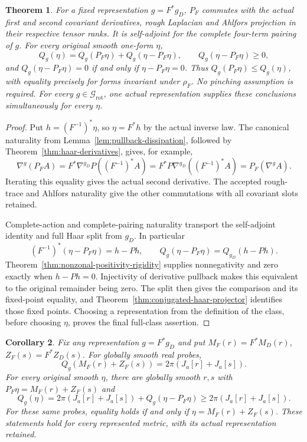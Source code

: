 \documentclass[11pt]{article}
\newtheorem{theorem}{Theorem}[section]
\newtheorem{corollary}[theorem]{Corollary}
\begin{document}
\begin{theorem}\label{thm:represented-haar-rigidity}
For a fixed representation $g=F^*g_D$, $P_F$ commutes with the actual
first and second covariant derivatives, rough Laplacian and Ahlfors projection
in their respective tensor ranks. It is self-adjoint for the complete
four-term pairing of $g$. For every original smooth one-form $\eta$,
\begin{equation}\label{eq:represented-haar-split}
 Q_g(\eta)=Q_g(P_F\eta)+Q_g(\eta-P_F\eta),\qquad
 Q_g(\eta-P_F\eta)\geq0,
\end{equation}
and $Q_g(\eta-P_F\eta)=0$ if and only if $\eta-P_F\eta=0$.
Thus $Q_g(P_F\eta)\leq Q_g(\eta)$, with equality precisely for forms
invariant under $\rho_F$. No pinching assumption is required.
For every $g\in\mathcal G_{\mathrm{rot}}$, one actual representation supplies
these conclusions simultaneously for every $\eta$.
\end{theorem}

\begin{proof}
Put $h=(F^{-1})^*\eta$, so $\eta=F^*h$ by the actual inverse law.
The canonical naturality from Lemma~\ref{lem:pullback-dissipation},
followed by Theorem~\ref{thm:haar-derivatives}, gives, for example,
\[
 \nabla^g(P_F A)
 =F^*\nabla^{g_D}P((F^{-1})^*A)
 =F^*P\nabla^{g_D}((F^{-1})^*A)
 =P_F(\nabla^g A).
\]
Iterating this equality gives the actual second derivative. The accepted
rough-trace and Ahlfors naturality give the other commutations with all
covariant slots retained.

Complete-action and complete-pairing naturality transport the self-adjoint
identity and full Haar split from $g_D$. In particular
\[
 (F^{-1})^*(\eta-P_F\eta)=h-Ph,\qquad
 Q_g(\eta-P_F\eta)=Q_{g_D}(h-Ph).
\]
Theorem~\ref{thm:nonzonal-positivity-rigidity} supplies nonnegativity and
zero exactly when $h-Ph=0$. Injectivity of derivative pullback makes this
equivalent to the original remainder being zero. The split then gives the
comparison and its fixed-point equality, and
Theorem~\ref{thm:conjugated-haar-projector} identifies those fixed points.
Choosing a representation from the definition of the class, before choosing
$\eta$, proves the final full-class assertion.
\end{proof}

\begin{corollary}\label{cor:represented-zonal-geometry}
Fix any representation $g=F^*g_D$ and put
$M_F(r)=F^*M_D(r)$, $Z_F(s)=F^*Z_D(s)$. For globally smooth real probes,
\[
 Q_g(M_F(r)+Z_F(s))=2\pi(J_a[r]+J_a[s]).
\]
For every original smooth $\eta$, there are globally smooth $r,s$ with
$P_F\eta=M_F(r)+Z_F(s)$ and
\[
 Q_g(\eta)=2\pi(J_a[r]+J_a[s])+Q_g(\eta-P_F\eta)
          \geq2\pi(J_a[r]+J_a[s]).
\]
For these same probes, equality holds if and only if
$\eta=M_F(r)+Z_F(s)$. These statements hold for every represented metric,
with its actual representation retained.
\end{corollary}
\end{document}
